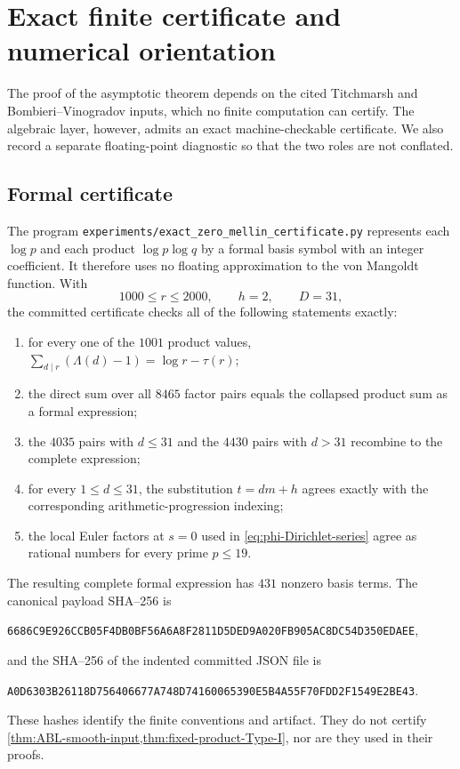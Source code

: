 \section{Exact finite certificate and numerical orientation}
\label{sec:certificate}

The proof of the asymptotic theorem depends on the cited Titchmarsh and
Bombieri--Vinogradov inputs, which no finite computation can certify.  The
algebraic layer, however, admits an exact machine-checkable certificate.  We
also record a separate floating-point diagnostic so that the two roles are
not conflated.

\subsection{Formal certificate}

The program
\texttt{experiments/exact\_zero\_mellin\_certificate.py} represents each
$\log p$ and each product $\log p\log q$ by a formal basis symbol with an
integer coefficient.  It therefore uses no floating approximation to the
von Mangoldt function.  With
\begin{equation}\label{eq:certificate-parameters}
 1000\leq r\leq2000,\qquad h=2,\qquad D=31,
\end{equation}
the committed certificate checks all of the following statements exactly:
\begin{enumerate}[label=\textup{(\alph*)}]
 \item for every one of the $1001$ product values,
 \(
   \sum_{d\mid r}(\Lambda(d)-1)=\log r-\tau(r);
 \)
 \item the direct sum over all $8465$ factor pairs equals the collapsed
 product sum as a formal expression;
 \item the $4035$ pairs with $d\leq31$ and the $4430$ pairs with $d>31$
 recombine to the complete expression;
 \item for every $1\leq d\leq31$, the substitution
 $t=dm+h$ agrees exactly with the corresponding arithmetic-progression
 indexing;
 \item the local Euler factors at $s=0$ used in
 \eqref{eq:phi-Dirichlet-series} agree as rational numbers for every prime
 $p\leq19$.
\end{enumerate}
The resulting complete formal expression has $431$ nonzero basis terms.
The canonical payload SHA--256 is
\begin{center}
 \nolinkurl{6686C9E926CCB05F4DB0BF56A6A8F2811D5DED9A020FB905AC8DC54D350EDAEE},
\end{center}
and the SHA--256 of the indented committed JSON file is
\begin{center}
 \nolinkurl{A0D6303B26118D756406677A748D74160065390E5B4A55F70FDD2F1549E2BE43}.
\end{center}
These hashes identify the finite conventions and artifact.  They do not
certify \cref{thm:ABL-smooth-input,thm:fixed-product-Type-I}, nor are they
used in their proofs.

